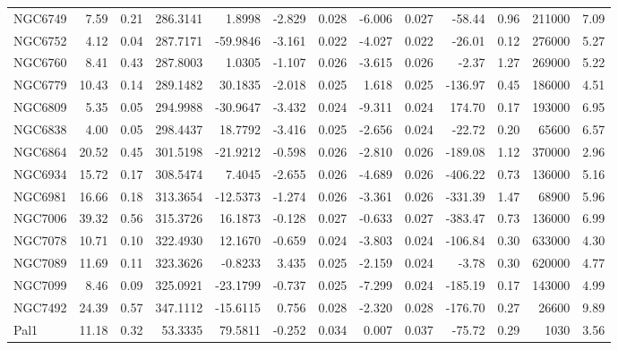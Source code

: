 \begin{longtable}{ | l | r | r| r | r | r | r | r | r | r | r | r | r  |}
            NGC6749       &   7.59 & 0.21 & 286.3141 &   1.8998 &  -2.829 & 0.028 &  -6.006 &  0.027 &  -58.44 &  0.96 &  211000 &  7.09\\ 
            NGC6752       &   4.12 & 0.04 & 287.7171 & -59.9846 &  -3.161 & 0.022 &  -4.027 &  0.022 &  -26.01 &  0.12 &  276000 &  5.27\\ 
            NGC6760       &   8.41 & 0.43 & 287.8003 &   1.0305 &  -1.107 & 0.026 &  -3.615 &  0.026 &   -2.37 &  1.27 &  269000 &  5.22\\ 
            NGC6779       &  10.43 & 0.14 & 289.1482 &  30.1835 &  -2.018 & 0.025 &   1.618 &  0.025 & -136.97 &  0.45 &  186000 &  4.51\\ 
            NGC6809       &   5.35 & 0.05 & 294.9988 & -30.9647 &  -3.432 & 0.024 &  -9.311 &  0.024 &  174.70 &  0.17 &  193000 &  6.95\\ 
            NGC6838       &   4.00 & 0.05 & 298.4437 &  18.7792 &  -3.416 & 0.025 &  -2.656 &  0.024 &  -22.72 &  0.20 &   65600 &  6.57\\ 
            NGC6864       &  20.52 & 0.45 & 301.5198 & -21.9212 &  -0.598 & 0.026 &  -2.810 &  0.026 & -189.08 &  1.12 &  370000 &  2.96\\ 
            NGC6934       &  15.72 & 0.17 & 308.5474 &   7.4045 &  -2.655 & 0.026 &  -4.689 &  0.026 & -406.22 &  0.73 &  136000 &  5.16\\ 
            NGC6981       &  16.66 & 0.18 & 313.3654 & -12.5373 &  -1.274 & 0.026 &  -3.361 &  0.026 & -331.39 &  1.47 &   68900 &  5.96\\ 
            NGC7006       &  39.32 & 0.56 & 315.3726 &  16.1873 &  -0.128 & 0.027 &  -0.633 &  0.027 & -383.47 &  0.73 &  136000 &  6.99\\ 
            NGC7078       &  10.71 & 0.10 & 322.4930 &  12.1670 &  -0.659 & 0.024 &  -3.803 &  0.024 & -106.84 &  0.30 &  633000 &  4.30\\ 
            NGC7089       &  11.69 & 0.11 & 323.3626 &  -0.8233 &   3.435 & 0.025 &  -2.159 &  0.024 &   -3.78 &  0.30 &  620000 &  4.77\\ 
            NGC7099       &   8.46 & 0.09 & 325.0921 & -23.1799 &  -0.737 & 0.025 &  -7.299 &  0.024 & -185.19 &  0.17 &  143000 &  4.99\\ 
            NGC7492       &  24.39 & 0.57 & 347.1112 & -15.6115 &   0.756 & 0.028 &  -2.320 &  0.028 & -176.70 &  0.27 &   26600 &  9.89\\ 
            Pal1          &  11.18 & 0.32 &  53.3335 &  79.5811 &  -0.252 & 0.034 &   0.007 &  0.037 &  -75.72 &  0.29 &    1030 &  3.56\\ 

\end{longtable}
